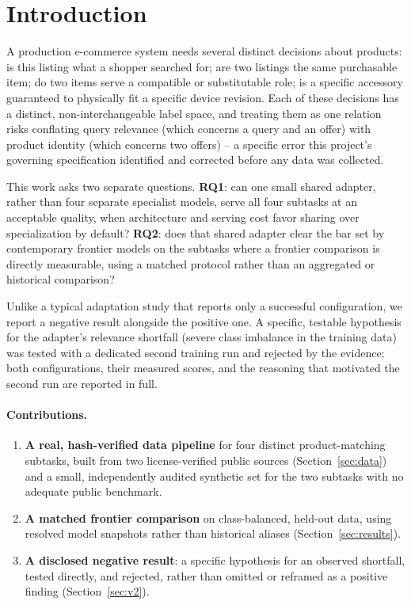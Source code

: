 \documentclass{article}
\begin{document}
\section{Introduction}
\label{sec:intro}
A production e-commerce system needs several distinct decisions about products: is this listing what a shopper searched for; are two listings the same purchasable item; do two items serve a compatible or substitutable role; is a specific accessory guaranteed to physically fit a specific device revision. Each of these decisions has a distinct, non-interchangeable label space, and treating them as one relation risks conflating query relevance (which concerns a query and an offer) with product identity (which concerns two offers) -- a specific error this project's governing specification identified and corrected before any data was collected.

This work asks two separate questions. \textbf{RQ1}: can one small shared adapter, rather than four separate specialist models, serve all four subtasks at an acceptable quality, when architecture and serving cost favor sharing over specialization by default? \textbf{RQ2}: does that shared adapter clear the bar set by contemporary frontier models on the subtasks where a frontier comparison is directly measurable, using a matched protocol rather than an aggregated or historical comparison?

Unlike a typical adaptation study that reports only a successful configuration, we report a negative result alongside the positive one. A specific, testable hypothesis for the adapter's relevance shortfall (severe class imbalance in the training data) was tested with a dedicated second training run and rejected by the evidence; both configurations, their measured scores, and the reasoning that motivated the second run are reported in full.

\paragraph{Contributions.}
\begin{enumerate}
\item \textbf{A real, hash-verified data pipeline} for four distinct product-matching subtasks, built from two license-verified public sources (Section~\ref{sec:data}) and a small, independently audited synthetic set for the two subtasks with no adequate public benchmark.
\item \textbf{A matched frontier comparison} on class-balanced, held-out data, using resolved model snapshots rather than historical aliases (Section~\ref{sec:results}).
\item \textbf{A disclosed negative result}: a specific hypothesis for an observed shortfall, tested directly, and rejected, rather than omitted or reframed as a positive finding (Section~\ref{sec:v2}).
\end{enumerate}
\end{document}
